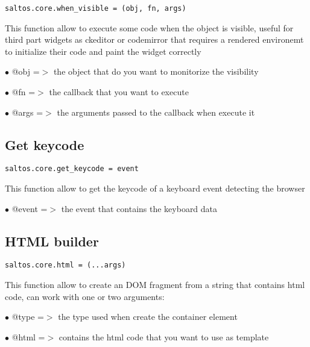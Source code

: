 \documentclass[a4paper]{book}
\begin{document}
\begin{lstlisting}
saltos.core.when_visible = (obj, fn, args)
\end{lstlisting}

This function allow to execute some code when the object is visible, useful for third part
widgets as ckeditor or codemirror that requires a rendered environemt to initialize their
code and paint the widget correctly

\begin{compactitem}
\item[\color{myblue}$\bullet$] @obj  =$>$ the object that do you want to monitorize the visibility
\item[\color{myblue}$\bullet$] @fn   =$>$ the callback that you want to execute
\item[\color{myblue}$\bullet$] @args =$>$ the arguments passed to the callback when execute it
\end{compactitem}

\hypertarget{toc486}{}
\subsection{Get keycode}

\begin{lstlisting}
saltos.core.get_keycode = event
\end{lstlisting}

This function allow to get the keycode of a keyboard event detecting the browser

\begin{compactitem}
\item[\color{myblue}$\bullet$] @event =$>$ the event that contains the keyboard data
\end{compactitem}

\hypertarget{toc487}{}
\subsection{HTML builder}

\begin{lstlisting}
saltos.core.html = (...args)
\end{lstlisting}

This function allow to create an DOM fragment from a string that contains html code, can
work with one or two arguments:

\begin{compactitem}
\item[\color{myblue}$\bullet$] @type =$>$ the type used when create the container element
\item[\color{myblue}$\bullet$] @html =$>$ contains the html code that you want to use as template
\end{compactitem}
\end{document}
